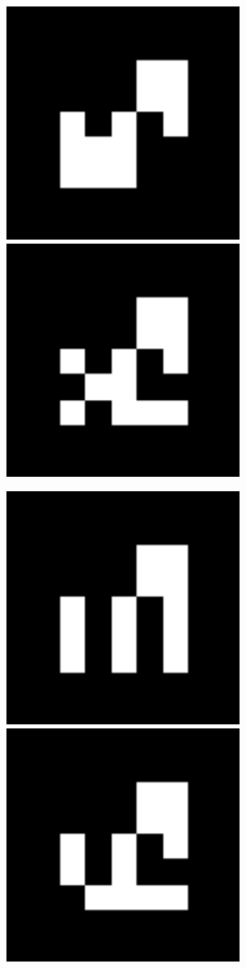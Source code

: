 \documentclass[10pt,letterpaper]{article}
\begin{document}
\includegraphics[width=3in]{MarkerData_105.png}
\includegraphics[width=3in]{MarkerData_106.png}


\includegraphics[width=3in]{MarkerData_107.png}
\includegraphics[width=3in]{MarkerData_108.png}
\end{document}
